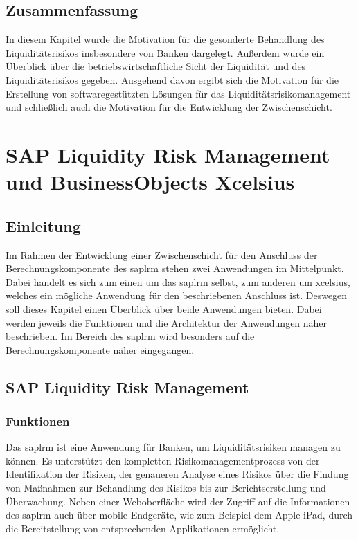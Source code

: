\begin{onehalfspacing}
\section{Zusammenfassung}
In diesem Kapitel wurde die Motivation für die gesonderte Behandlung des Liquiditätsrisikos insbesondere von Banken dargelegt. Außerdem wurde ein Überblick über die betriebswirtschaftliche Sicht der Liquidität und des Liquiditätsrisikos gegeben. Ausgehend davon ergibt sich die Motivation für die Erstellung von softwaregestützten Lösungen für das Liquiditätsrisikomanagement und schließlich auch die Motivation für die Entwicklung der Zwischenschicht.

\chapter{SAP Liquidity Risk Management und BusinessObjects Xcelsius}
\section{Einleitung}
Im Rahmen der Entwicklung einer Zwischenschicht für den Anschluss der Berechnungskomponente des \gls{saplrm} stehen zwei Anwendungen im Mittelpunkt. Dabei handelt es sich zum einen um das \gls{saplrm} selbst, zum anderen um \gls{xcelsius}, welches ein mögliche Anwendung für den beschriebenen Anschluss ist. Deswegen soll dieses Kapitel einen Überblick über beide Anwendungen bieten. Dabei werden jeweils die Funktionen und die Architektur der Anwendungen näher beschrieben. Im Bereich des \gls{saplrm} wird besonders auf die Berechnungskomponente näher eingegangen.

\section{SAP Liquidity Risk Management}

\subsection{Funktionen}
Das \gls{saplrm} ist eine Anwendung für Banken, um Liquiditätsrisiken managen zu können. Es unterstützt den kompletten Risikomanagementprozess von der Identifikation der Risiken, der genaueren Analyse eines Risikos über die Findung von Maßnahmen zur Behandlung des Risikos bis zur Berichtserstellung und Überwachung. Neben einer Weboberfläche wird der Zugriff auf die Informationen des \gls{saplrm} auch über mobile Endgeräte, wie zum Beispiel dem Apple iPad, durch die Bereitstellung von entsprechenden Applikationen ermöglicht.


\end{onehalfspacing}
